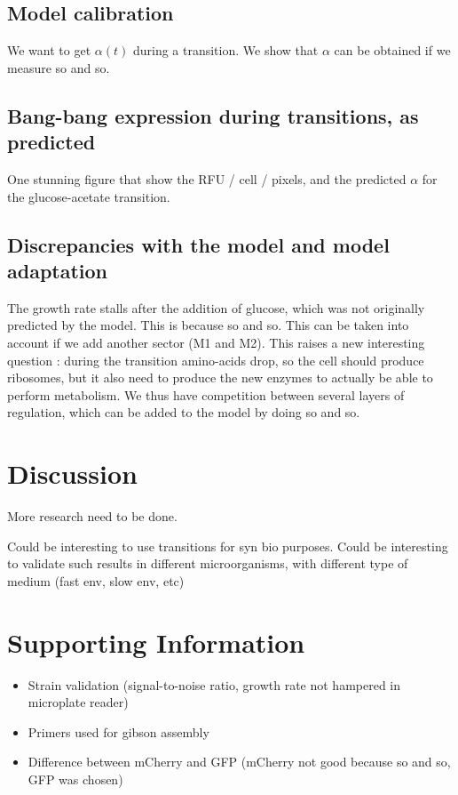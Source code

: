 \subsection{Model calibration}

We want to get $\alpha (t)$ during a transition. We show that $\alpha$ can be obtained if we measure so and so.

\subsection{Bang-bang expression during transitions, as predicted}

One stunning figure that show the RFU / cell / pixels, and the predicted $\alpha$ for the glucose-acetate transition.

\subsection{Discrepancies with the model and model adaptation}

The growth rate stalls after the addition of glucose, which was not originally predicted by the model.
This is because so and so.
This can be taken into account if we add another sector (M1 and M2).
This raises a new interesting question : during the transition amino-acids drop, so the cell should produce ribosomes, but it also need to produce the new enzymes to actually be able to perform metabolism.
We thus have competition between several layers of regulation, which can be added to the model by doing so and so.

\section{Discussion}

More research need to be done.

Could be interesting to use transitions for syn bio purposes.
Could be interesting to validate such results in different microorganisms, with different type of medium (fast env, slow env, etc)

\section{Supporting Information}

\begin{itemize}
\item Strain validation (signal-to-noise ratio, growth rate not hampered in microplate reader)
\item Primers used for gibson assembly
\item Difference between mCherry and GFP (mCherry not good because so and so, GFP was chosen)
\end{itemize}